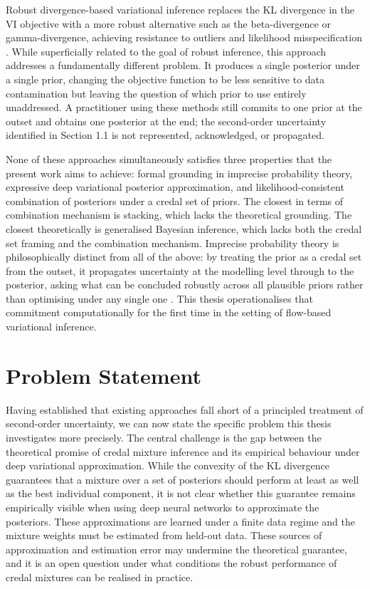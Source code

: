 Robust divergence-based variational inference replaces the KL divergence 
in the VI objective with a more robust alternative such as the 
beta-divergence or gamma-divergence, achieving resistance to outliers 
and likelihood misspecification \citep{futami2018, knoblauch2019}. While superficially related to the goal of robust inference, 
this approach addresses a fundamentally different problem. It produces 
a single posterior under a single prior, changing the objective function 
to be less sensitive to data contamination but leaving the question of 
which prior to use entirely unaddressed. A practitioner using these 
methods still commits to one prior at the outset and obtains one 
posterior at the end; the second-order uncertainty identified in 
Section 1.1 is not represented, acknowledged, or propagated.

\bigskip

None of these approaches simultaneously satisfies three properties 
that the present work aims to achieve: formal grounding in imprecise 
probability theory, expressive deep variational posterior approximation, 
and likelihood-consistent combination of posteriors under a credal set 
of priors. The closest in terms of combination mechanism is stacking, 
which lacks the theoretical grounding. The closest theoretically is 
generalised Bayesian inference, which lacks both the credal set framing 
and the combination mechanism. Imprecise probability theory is 
philosophically distinct from all of the above: by treating the prior 
as a credal set from the outset, it propagates uncertainty at the 
modelling level through to the posterior, asking what can be concluded 
robustly across all plausible priors rather than optimising under any 
single one \citep{walley1991, wheeler2022}. This thesis operationalises 
that commitment computationally for the first time in the setting of 
flow-based variational inference.

\section{Problem Statement}

Having established that existing approaches fall short of a principled 
treatment of second-order uncertainty, we can now state the specific 
problem this thesis investigates more precisely. The central challenge 
is the gap between the theoretical promise of credal mixture inference 
and its empirical behaviour under deep variational approximation. While 
the convexity of the KL divergence guarantees that a mixture over a 
set of posteriors should perform at least as well as the best individual 
component, it is not clear whether this guarantee remains empirically 
visible when using deep neural networks to approximate the posteriors. 
These approximations are learned under a finite data regime and the 
mixture weights must be estimated from held-out data. These sources of 
approximation and estimation error may undermine the theoretical 
guarantee, and it is an open question under what conditions the robust 
performance of credal mixtures can be realised in practice.

